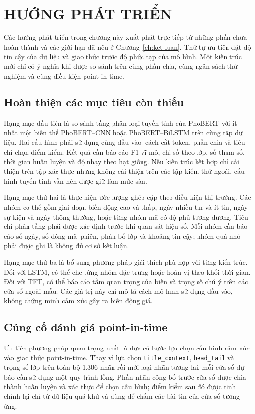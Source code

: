 \documentclass[12pt, a4paper, oneside]{report}
\begin{document}
\chapter{HƯỚNG PHÁT TRIỂN}
\label{ch:huong-phat-trien}

Các hướng phát triển trong chương này xuất phát trực tiếp từ những phần chưa hoàn thành
và các giới hạn đã nêu ở Chương~\ref{ch:ket-luan}. Thứ tự ưu tiên đặt độ tin cậy của dữ
liệu và giao thức trước độ phức tạp của mô hình. Một kiến trúc mới chỉ có ý nghĩa khi
được so sánh trên cùng phần chia, cùng ngân sách thử nghiệm và cùng điều kiện point-in-time.

\section{Hoàn thiện các mục tiêu còn thiếu}

Hạng mục đầu tiên là so sánh tầng phân loại tuyến tính của PhoBERT với ít nhất một biến
thể PhoBERT--CNN hoặc PhoBERT--BiLSTM trên cùng tập dữ liệu. Hai cấu hình phải sử dụng
cùng đầu vào, cách cắt token, phần chia và tiêu chí chọn điểm kiểm. Kết quả cần báo cáo
F1 vĩ mô, chỉ số theo lớp, số tham số, thời gian huấn luyện và độ nhạy theo hạt giống.
Nếu kiến trúc kết hợp chỉ cải thiện trên tập xác thực nhưng không cải thiện trên các tập
kiểm thử ngoài, cấu hình tuyến tính vẫn nên được giữ làm mức sàn.

Hạng mục thứ hai là thực hiện ước lượng ghép cặp theo điều kiện thị trường. Các nhóm có
thể gồm giai đoạn biến động cao và thấp, ngày nhiều tin và ít tin, ngày sự kiện và ngày
thông thường, hoặc từng nhóm mã có độ phủ tương đương. Tiêu chí phân tầng phải được
xác định trước khi quan sát hiệu số. Mỗi nhóm cần báo cáo số ngày, số dòng mã--phiên,
phân bố lớp và khoảng tin cậy; nhóm quá nhỏ phải được ghi là không đủ cơ sở kết luận.

Hạng mục thứ ba là bổ sung phương pháp giải thích phù hợp với từng kiến trúc. Đối với
LSTM, có thể che từng nhóm đặc trưng hoặc hoán vị theo khối thời gian. Đối với TFT, có
thể báo cáo tầm quan trọng của biến và trọng số chú ý trên các cửa sổ ngoài mẫu. Các
giá trị này chỉ mô tả cách mô hình sử dụng đầu vào, không chứng minh cảm xúc gây ra
biến động giá.

\section{Củng cố đánh giá point-in-time}

Ưu tiên phương pháp quan trọng nhất là đưa cả bước lựa chọn cấu hình cảm xúc vào giao
thức point-in-time. Thay vì lựa chọn \texttt{title\_context},
\texttt{head\_tail} và trọng số lớp trên toàn bộ 1.306 nhãn rồi mới loại nhãn tương
lai, mỗi cửa sổ dự báo cần sử dụng một quy trình lồng. Phần nhãn công bố trước cửa sổ
được chia thành huấn luyện và xác thực để chọn cấu hình; điểm kiểm sau đó được tinh
chỉnh lại chỉ từ dữ liệu quá khứ và dùng để chấm các bài tin của cửa sổ tương ứng.
\end{document}

